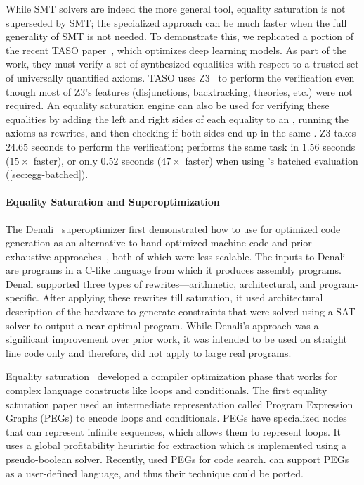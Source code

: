While SMT solvers are indeed the more general tool,
  equality saturation is not superseded by SMT;
  the specialized approach can be much faster when the full generality of SMT is
  not needed.
To demonstrate this, we replicated a portion of the recent TASO paper~\cite{taso},
  which optimizes deep learning models.
As part of the work, they must verify a set of synthesized equalities with
  respect to a trusted set of universally quantified axioms.
TASO uses Z3~\cite{z3} to perform the
  verification even though most of Z3's features
  (disjunctions, backtracking, theories, etc.)
  were not required.
An equality saturation engine can also be used for verifying these equalities
  by adding the left and right sides of
  each equality to an \egraph,
  running the axioms as rewrites,
  and then checking if both sides end up in the same \eclass.
Z3 takes 24.65 seconds to perform the verification;
  \egg performs the same task in 1.56 seconds ($15\times$ faster),
  or only 0.52 seconds ($47\times$ faster) when using
  \egg's batched evaluation (\autoref{sec:egg-batched}).

\paragraph{Equality Saturation and Superoptimization}
The Denali~\cite{denali} superoptimizer first demonstrated how to use \egraphs
for optimized code generation as an alternative to hand-optimized machine code
and prior exhaustive approaches~\cite{massalin}, both of which were less
scalable. The inputs to Denali are programs in a C-like language from which it
produces assembly programs. Denali supported three types of
rewrites---arithmetic, architectural, and program-specific. After applying these
rewrites till saturation, it used architectural description of the hardware to
generate constraints that were solved using a SAT solver to output a
near-optimal program. While Denali's approach was a significant improvement over
prior work, it was intended to be used on straight line code only and therefore,
did not apply to large real programs.

Equality saturation~\cite{eqsat, eqsat-llvm} developed a compiler optimization
phase that works for complex language constructs like loops and conditionals.
The first equality saturation paper used an intermediate representation called
Program Expression Graphs (PEGs) to encode loops and conditionals. PEGs have
specialized nodes that can represent infinite sequences, which allows them to
represent loops. It uses a global profitability heuristic for extraction which
is implemented using a pseudo-boolean solver. Recently, \cite{yogo-pldi20} used
PEGs for code search.
\egg can support PEGs as a user-defined language,
and thus their technique could be ported.



